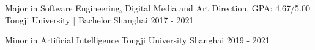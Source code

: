 
\begin{cventries}
  \cventry
    {Major in Software Engineering, Digital Media and Art Direction, GPA: 4.67/5.00} %
    {Tongji University | Bachelor} %
    {Shanghai} %
    {2017 - 2021} %
    {
      \begin{cvitems} %
         \vspace{0.5mm}
      \end{cvitems}
    }
    
    \cventry
        {Minor in Artificial Intelligence} %
        {Tongji University} %
        {Shanghai} %
        {2019 - 2021} %
    {
      \begin{cvitems} %
      \end{cvitems}
    }
    
\end{cventries}